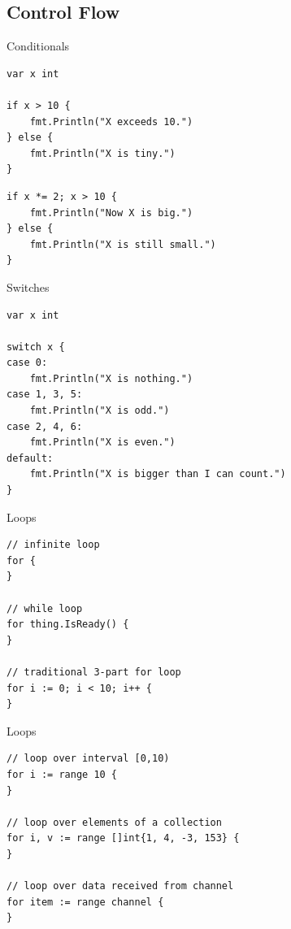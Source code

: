 \documentclass[pdf,t]{beamer}
\begin{document}
\subsection{Control Flow}
\begin{frame}[fragile]{Conditionals}
\begin{lstlisting}
var x int

if x > 10 {
    fmt.Println("X exceeds 10.")
} else {
    fmt.Println("X is tiny.")
}
\end{lstlisting}
\pause
\begin{lstlisting}
if x *= 2; x > 10 {
    fmt.Println("Now X is big.")
} else {
    fmt.Println("X is still small.")
}
\end{lstlisting}
\end{frame}
\begin{frame}[fragile]{Switches}
\begin{lstlisting}
var x int

switch x {
case 0:
    fmt.Println("X is nothing.")
case 1, 3, 5:
    fmt.Println("X is odd.")
case 2, 4, 6:
    fmt.Println("X is even.")
default:
    fmt.Println("X is bigger than I can count.")
}
\end{lstlisting}
\end{frame}
\begin{frame}[fragile]{Loops}
\begin{lstlisting}
// infinite loop
for {
}

// while loop
for thing.IsReady() {
}

// traditional 3-part for loop
for i := 0; i < 10; i++ {
}
\end{lstlisting}
\end{frame}

\begin{frame}[fragile]{Loops}
\begin{lstlisting}
// loop over interval [0,10)
for i := range 10 {
}

// loop over elements of a collection
for i, v := range []int{1, 4, -3, 153} {
}

// loop over data received from channel
for item := range channel {
}
\end{lstlisting}
\end{frame}
\end{document}
